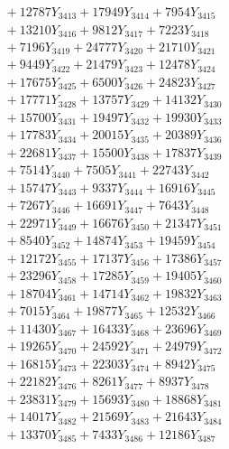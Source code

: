 \documentclass[a4paper,10pt]{article}
\begin{document}
{\begin{align}
&\;  + 12787 Y_{3413} + 17949 Y_{3414} + 7954 Y_{3415} \\[0.3ex]
&\;  + 13210 Y_{3416} + 9812 Y_{3417} + 7223 Y_{3418} \\[0.5ex]\allowbreak
&\;  + 7196 Y_{3419} + 24777 Y_{3420} + 21710 Y_{3421} \\[0.3ex]
&\;  + 9449 Y_{3422} + 21479 Y_{3423} + 12478 Y_{3424} \\[0.3ex]
&\;  + 17675 Y_{3425} + 6500 Y_{3426} + 24823 Y_{3427} \\[0.3ex]
&\;  + 17771 Y_{3428} + 13757 Y_{3429} + 14132 Y_{3430} \\[0.3ex]
&\;  + 15700 Y_{3431} + 19497 Y_{3432} + 19930 Y_{3433} \\[0.3ex]
&\;  + 17783 Y_{3434} + 20015 Y_{3435} + 20389 Y_{3436} \\[0.3ex]
&\;  + 22681 Y_{3437} + 15500 Y_{3438} + 17837 Y_{3439} \\[0.3ex]
&\;  + 7514 Y_{3440} + 7505 Y_{3441} + 22743 Y_{3442} \\[0.3ex]
&\;  + 15747 Y_{3443} + 9337 Y_{3444} + 16916 Y_{3445} \\[0.3ex]
&\;  + 7267 Y_{3446} + 16691 Y_{3447} + 7643 Y_{3448} \\[0.5ex]\allowbreak
&\;  + 22971 Y_{3449} + 16676 Y_{3450} + 21347 Y_{3451} \\[0.3ex]
&\;  + 8540 Y_{3452} + 14874 Y_{3453} + 19459 Y_{3454} \\[0.3ex]
&\;  + 12172 Y_{3455} + 17137 Y_{3456} + 17386 Y_{3457} \\[0.3ex]
&\;  + 23296 Y_{3458} + 17285 Y_{3459} + 19405 Y_{3460} \\[0.3ex]
&\;  + 18704 Y_{3461} + 14714 Y_{3462} + 19832 Y_{3463} \\[0.3ex]
&\;  + 7015 Y_{3464} + 19877 Y_{3465} + 12532 Y_{3466} \\[0.3ex]
&\;  + 11430 Y_{3467} + 16433 Y_{3468} + 23696 Y_{3469} \\[0.3ex]
&\;  + 19265 Y_{3470} + 24592 Y_{3471} + 24979 Y_{3472} \\[0.3ex]
&\;  + 16815 Y_{3473} + 22303 Y_{3474} + 8942 Y_{3475} \\[0.3ex]
&\;  + 22182 Y_{3476} + 8261 Y_{3477} + 8937 Y_{3478} \\[0.5ex]\allowbreak
&\;  + 23831 Y_{3479} + 15693 Y_{3480} + 18868 Y_{3481} \\[0.3ex]
&\;  + 14017 Y_{3482} + 21569 Y_{3483} + 21643 Y_{3484} \\[0.3ex]
&\;  + 13370 Y_{3485} + 7433 Y_{3486} + 12186 Y_{3487} \\[0.3ex]

\end{align}}
\end{document}

